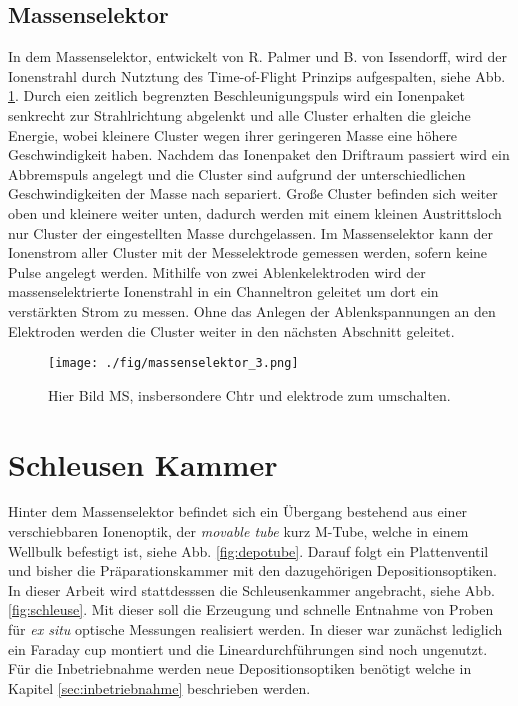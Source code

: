 \subsection{Massenselektor}
In dem Massenselektor, entwickelt von R. Palmer und B. von Issendorff\cite{Issendorff.1999}, wird der Ionenstrahl durch Nutztung des Time-of-Flight Prinzips aufgespalten, siehe Abb. \ref{fig:mschtr}.
Durch eien zeitlich begrenzten Beschleunigungspuls wird ein Ionenpaket senkrecht zur Strahlrichtung abgelenkt und alle Cluster erhalten die gleiche Energie, wobei kleinere Cluster wegen ihrer geringeren Masse eine höhere Geschwindigkeit haben.
Nachdem das Ionenpaket den Driftraum passiert wird ein Abbremspuls angelegt und die Cluster sind aufgrund der unterschiedlichen Geschwindigkeiten der Masse nach separiert.
Große Cluster befinden sich weiter oben und kleinere weiter unten, dadurch werden mit einem kleinen Austrittsloch nur Cluster der eingestellten Masse durchgelassen.
Im Massenselektor kann der Ionenstrom aller Cluster mit der Messelektrode gemessen werden, sofern keine Pulse angelegt werden.
Mithilfe von zwei Ablenkelektroden wird der massenselektrierte Ionenstrahl in ein Channeltron geleitet um dort ein verstärkten Strom zu messen.
Ohne das Anlegen der Ablenkspannungen an den Elektroden werden die Cluster weiter in den nächsten Abschnitt geleitet.

\begin{figure}
    \centering
    \texttt{[image: ./fig/massenselektor\_3.png]}
    \caption{Hier Bild MS, insbersondere Chtr und elektrode zum umschalten.}
    \label{fig:mschtr}
\end{figure}

\section{Schleusen Kammer}
\label{sec:schleuse}
Hinter dem Massenselektor befindet sich ein Übergang bestehend aus einer verschiebbaren Ionenoptik, der \textit{movable tube} kurz M-Tube, welche in einem Wellbulk befestigt ist, siehe Abb. \ref{fig:depotube}.
Darauf folgt ein Plattenventil und bisher die Präparationskammer mit den dazugehörigen Depositionsoptiken.
In dieser Arbeit wird stattdesssen die Schleusenkammer angebracht, siehe Abb. \ref{fig:schleuse}.
Mit dieser soll die Erzeugung und schnelle Entnahme von Proben für \textit{ex situ} optische Messungen realisiert werden.
In dieser war zunächst lediglich ein Faraday cup montiert und die Lineardurchführungen sind noch ungenutzt.
Für die Inbetriebnahme werden neue Depositionsoptiken benötigt welche in Kapitel \ref{sec:inbetriebnahme} beschrieben werden.

